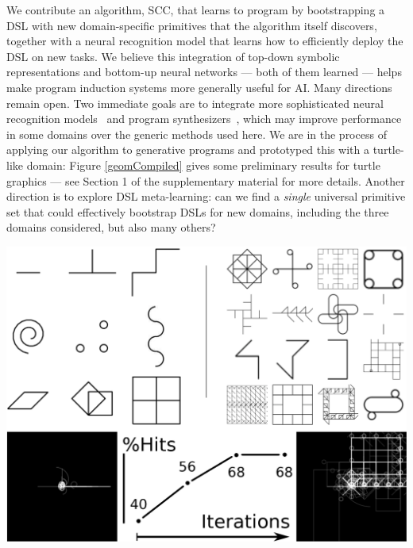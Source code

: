 \documentclass{article}
\newcommand{\systemEnding}{\textsc{SCC}}
\begin{document}
\parbox{0.58\textwidth}{

We contribute an algorithm, \systemEnding, that learns to program by
bootstrapping a DSL with new domain-specific primitives that the algorithm
itself discovers, together with a neural recognition model that learns how to
efficiently deploy the DSL on new tasks. We believe this integration of top-down
symbolic representations and bottom-up neural networks --- both of them learned
--- helps make program induction systems more generally useful for AI. Many
directions remain open.
Two immediate goals are to integrate more sophisticated neural recognition
models~\cite{devlin2017robustfill} and program
synthesizers~\cite{solar2008program}, which may improve performance in some
domains over the generic methods used here.
We are in the process of applying our algorithm to generative programs and
prototyped this with a turtle-like domain: Figure \ref{geomCompiled} gives some
preliminary results for turtle graphics  --- see Section 1 of the supplementary material for more
details.  Another direction is to explore DSL meta-learning: can we find a
\emph{single} universal primitive set that could effectively bootstrap DSLs for
new domains, including the three domains considered,  but also many others?
}\hfill
\begin{minipage}{0.4\textwidth}
  \centering
  \includegraphics[width=\textwidth]{figures/geomCompiled.eps} 
\label{geomCompiled}
\end{minipage}


{\small }
\end{document}
